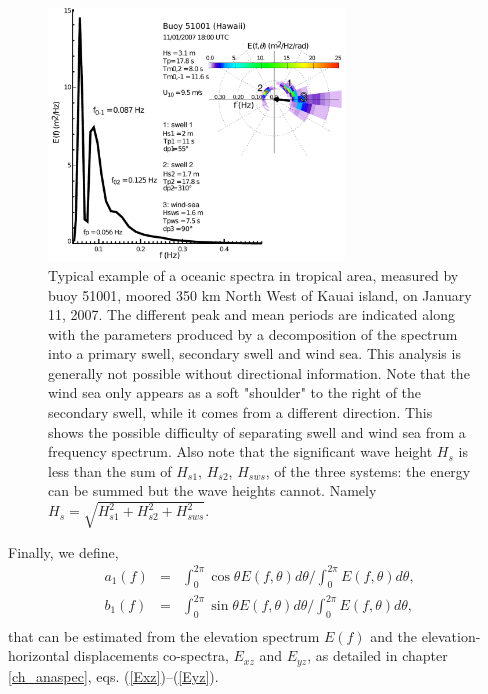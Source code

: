\begin{figure}[htb]
\centerline{\includegraphics[width=0.7\textwidth]{FIGS_CH_MEASUREMENTS/exemple_spectre_Hawaii.pdf}}
\caption{
Typical example of a oceanic spectra in tropical area, measured by buoy 51001, moored 350 km North West of Kauai island, on January 11, 2007. 
The different peak and mean periods are indicated along with the parameters produced by a decomposition of the spectrum into a primary
swell, secondary swell and wind sea. This analysis is generally not possible without directional information. Note that the wind sea only appears 
as a soft "shoulder" to the right of the secondary swell, while it comes from a different direction. This shows the possible difficulty of 
separating swell and wind sea from a frequency spectrum. Also note that the significant 
wave height $H_s$ is less than the sum of $H_{s1}$, $H_{s2}$, $H_{sws}$, of the three systems: the energy can be summed but the wave heights cannot.
Namely $H_s=\sqrt{H_{s1}^2+H_{s2}^2+H_{sws}^2}$.}
\label{fig:Hawaii_spectrum}
\end{figure}


Finally, we define, 
\begin{eqnarray}
a_{1}(f) & = &\int_{0}^{2\pi} \cos{\theta} E(f,\theta)d\theta /\int_{0}^{2\pi} E(f,\theta)d\theta, \label{a1def} \\
b_{1}(f) & = & \int_{0}^{2\pi} \sin{\theta} E(f,\theta)d\theta /\int_{0}^{2\pi} E(f,\theta)d\theta ,\label{b1def} \\
\end{eqnarray}
that can be estimated from the elevation spectrum $E(f)$ and the elevation-horizontal displacements
co-spectra, $E_{xz}$ and  $E_{yz}$, as detailed in chapter \ref{ch_anaspec},   eqs. (\ref{Exz})--(\ref{Eyz}). 

